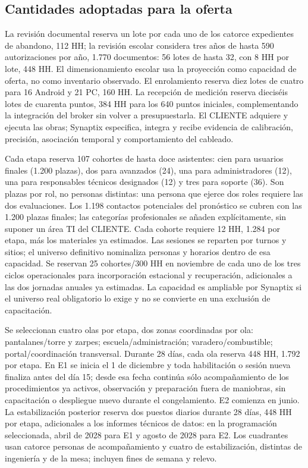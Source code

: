 \subsection{Cantidades adoptadas para la oferta} %
La revisión documental reserva un lote por cada uno de los catorce expedientes de abandono, 112 HH; la revisión escolar considera tres años de hasta 590 autorizaciones por año, 1.770 documentos: 56 lotes de hasta 32, con 8 HH por lote, 448 HH. El dimensionamiento escolar usa la proyección como capacidad de oferta, no como inventario observado. El enrolamiento reserva diez lotes de cuatro para 16 Android y 21 PC, 160 HH. La recepción de medición reserva dieciséis lotes de cuarenta puntos, 384 HH para los 640 puntos iniciales, complementando la integración del broker sin volver a presupuestarla. El CLIENTE adquiere y ejecuta las obras; Synaptix especifica, integra y recibe evidencia de calibración, precisión, asociación temporal y comportamiento del cableado.

Cada etapa reserva 107 cohortes de hasta doce asistentes: cien para usuarios finales (1.200 plazas), dos para avanzados (24), una para administradores (12), una para responsables técnicos designados (12) y tres para soporte (36). Son plazas por rol, no personas distintas: una persona que ejerce dos roles requiere las dos evaluaciones. Los 1.198 contactos potenciales del pronóstico se cubren con las 1.200 plazas finales; las categorías profesionales se añaden explícitamente, sin suponer un área TI del CLIENTE. Cada cohorte requiere 12 HH, 1.284 por etapa, más los materiales ya estimados. Las sesiones se reparten por turnos y sitios; el universo definitivo nominaliza personas y horarios dentro de esa capacidad. Se reservan 25 cohortes/300 HH en noviembre de cada uno de los tres ciclos operacionales para incorporación estacional y recuperación, adicionales a las dos jornadas anuales ya estimadas. La capacidad es ampliable por Synaptix si el universo real obligatorio lo exige y no se convierte en una exclusión de capacitación.

Se seleccionan cuatro olas por etapa, dos zonas coordinadas por ola: pantalanes/torre y zarpes; escuela/administración; varadero/combustible; portal/coordinación transversal. Durante 28 días, cada ola reserva 448 HH, 1.792 por etapa. En E1 se inicia el 1 de diciembre y toda habilitación o sesión nueva finaliza antes del día 15; desde esa fecha continúa sólo acompañamiento de los procedimientos ya activos, observación y preparación fuera de maniobras, sin capacitación o despliegue nuevo durante el congelamiento. E2 comienza en junio. La estabilización posterior reserva dos puestos diarios durante 28 días, 448 HH por etapa, adicionales a los informes técnicos de datos: en la programación seleccionada, abril de 2028 para E1 y agosto de 2028 para E2. Los cuadrantes usan catorce personas de acompañamiento y cuatro de estabilización, distintas de ingeniería y de la mesa; incluyen fines de semana y relevo.


